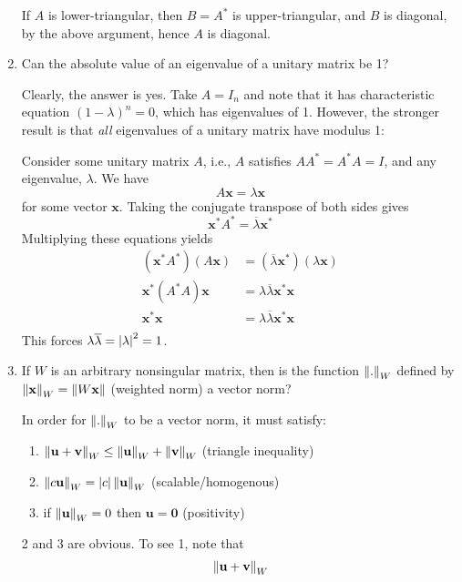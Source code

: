 \begin{enumerate}
\begin{solution}
        If \(A\) is lower-triangular, then \(B=A^*\) is upper-triangular, and \(B\) is diagonal, by the above argument, hence \(A\) is diagonal.
\end{solution}
\item Can the absolute value of an eigenvalue of a unitary matrix be 1?
\begin{solution}
    Clearly, the answer is yes. Take \(A=I_n\) and note that it has characteristic equation \((1-\lambda)^n=0\), which has eigenvalues of 1. However, the stronger result is that \textit{all} eigenvalues of a unitary matrix have modulus 1:
    
Consider some unitary matrix \(A\), i.e., \(A\) satisfies \(AA^*=A^*A=I\), and any eigenvalue, \(\lambda\). We have \[A\mathbf{x}=\lambda\mathbf{x}\] for some vector \(\mathbf{x}\). Taking the conjugate transpose of both sides gives \[\mathbf{x}^*A^*=\overline{\lambda}\mathbf{x}^*\] Multiplying these equations yields \begin{align*}\left(\mathbf{x}^*A^*\right)\left(A\mathbf{x}\right)&=\left(\overline{\lambda}\mathbf{x}^*\right)\left(\lambda\mathbf{x}\right)\\\mathbf{x}^*\left(A^*A\right)\mathbf{x}&=\lambda\overline{\lambda}\mathbf{x}^*\mathbf{x}\\\mathbf{x}^*\mathbf{x}&=\lambda\overline{\lambda}\mathbf{x}^*\mathbf{x}\\\end{align*}This forces \(\lambda\overline{\lambda}=\left|\lambda\right|^2=1\).
\end{solution}
\item If \(W\) is an arbitrary nonsingular matrix, then is the function \(\left\lVert.\right\rVert_W\) defined by \(\left\lVert\mathbf{x}\right\rVert_W=\left\lVert W\mathbf{x}\right\rVert\) (weighted norm) a vector norm?
\begin{solution}
    In order for \(\left\lVert.\right\rVert_W\) to be a vector norm, it must satisfy:
    \begin{enumerate}[1.]
        \item \(\left\lVert\mathbf{u} + \mathbf{v}\right\rVert_W \leq \left\lVert\mathbf{u}\right\rVert_W + \left\lVert\mathbf{v}\right\rVert_W\) (triangle inequality)
        \item \(\left\lVert c\mathbf{u}\right\rVert_W=\left|c\right|\left\lVert\mathbf{u}\right\rVert_W\) (scalable/homogenous)
        \item if \(\left\lVert\mathbf{u}\right\rVert_W = 0\) then \(\mathbf{u}=\mathbf{0}\) (positivity)
    \end{enumerate}
    2 and 3 are obvious. To see 1, note that 
    \begin{align*}\norm{\mathbf{u} + \mathbf{v}}_W

\end{align*}
\end{solution}
\end{enumerate}
